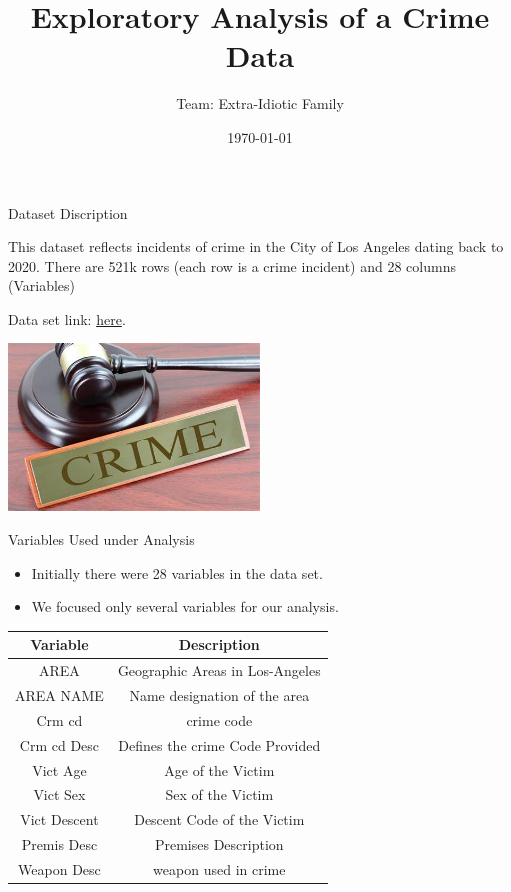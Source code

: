 \documentclass{beamer}\usepackage[]{graphicx}\usepackage[]{xcolor}
\title{Exploratory Analysis of a Crime Data}  %
\author{Team: Extra-Idiotic Family}                              %
\institute{University of Nebraska-Lincoln}                  %
\date{\today}
\newenvironment{knitrout}{}{} %
\begin{document}
\begin{frame}
  \titlepage
\end{frame}


\begin{frame}{Dataset Discription}

This dataset reflects incidents of crime in the City of Los Angeles dating back to 2020. There are 521k rows (each row is a crime incident) and 28 columns (Variables)

Data set link: \href{https://data.lacity.org/Public-Safety/Crime-Data-from-2020-to-Present/2nrs-mtv8}{here}.



\begin{knitrout}
\color{fgcolor}
\includegraphics[width=0.5\textwidth]{figure/title.jpg}
\end{knitrout}
\end{frame}

\begin{frame}{Variables Used under Analysis}

\begin{itemize}
\item Initially there were 28 variables in the data set.
\item We focused only several variables for our analysis.
\end{itemize}



\begin{tabular}{|c||c|}
\hline
    Variable & Description \\ 
\hline
    AREA & Geographic Areas in Los-Angeles \\ 
\hline
    AREA NAME & Name designation of the area \\ 
\hline
Crm cd & crime code\\
\hline
Crm cd Desc & Defines the crime Code Provided\\
\hline
Vict Age & Age of the Victim\\
\hline
Vict Sex & Sex of the Victim\\
\hline
Vict Descent & Descent Code of the Victim\\
\hline
Premis Desc & Premises Description\\
\hline
Weapon Desc & weapon used in crime\\
\hline
\end{tabular}
\end{frame}
\end{document}
